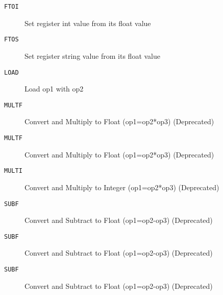 
\begin{description}
\item[\texttt{FTOI       }]  Set register int value from its float value\\
\end{description}

\begin{description}
\item[\texttt{FTOS       }]  Set register string value from its float value\\
\end{description}

\begin{description}
\item[\texttt{LOAD       }]  Load op1 with op2\\
\end{description}

\begin{description}
\item[\texttt{MULTF      }]  Convert and Multiply to Float (op1=op2*op3) (Deprecated)\\
\end{description}

\begin{description}
\item[\texttt{MULTF      }]  Convert and Multiply to Float (op1=op2*op3) (Deprecated)\\
\end{description}

\begin{description}
\item[\texttt{MULTI      }]  Convert and Multiply to Integer (op1=op2*op3) (Deprecated)\\
\end{description}

\begin{description}
\item[\texttt{SUBF       }]  Convert and Subtract to Float (op1=op2-op3) (Deprecated)\\
\end{description}

\begin{description}
\item[\texttt{SUBF       }]  Convert and Subtract to Float (op1=op2-op3) (Deprecated)\\
\end{description}

\begin{description}
\item[\texttt{SUBF       }]  Convert and Subtract to Float (op1=op2-op3) (Deprecated)\\
\end{description}
